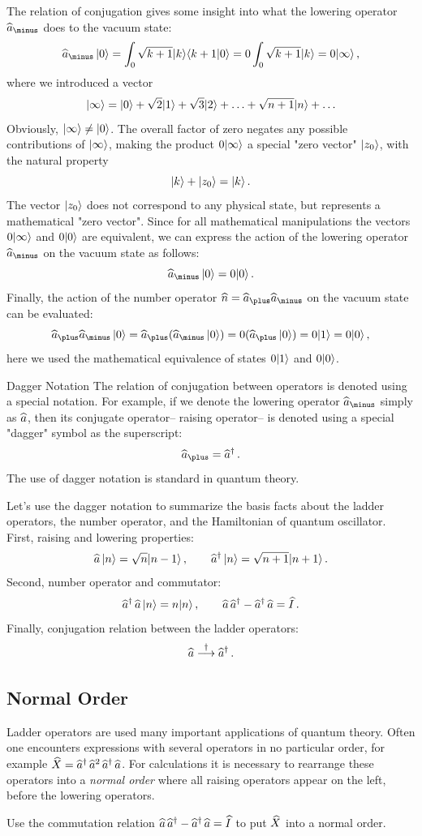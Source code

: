 The relation of conjugation gives some insight into what the lowering operator $\op{a}_\minus$ does to the vacuum state:
\[
\op{a}_\minus\,\ket{0}=\int_0  \sqrt{k+1}\ket{k}\braket{k+1}{0}=0\int_0\sqrt{k+1}\ket{k}=0\ket{\infty}\,,
\]
where we introduced a vector 
\[
|{\infty}\rangle=|{0}\rangle+\sqrt{2}|{1}\rangle+\sqrt{3}|{2}\rangle+\ldots+\sqrt{n+1}|{n}\rangle+\ldots
\]
Obviously, $|{\infty}\rangle\ne|{0}\rangle$. The overall factor of zero negates any possible contributions of $|{\infty}\rangle$, making the product $0|{\infty}\rangle$ a special "zero vector" $|{z_0}\rangle$, with the natural property
\[
|{k}\rangle+|{z_0}\rangle=|{k}\rangle\,.
\]
The vector $|{z_0}\rangle$ does not correspond to any physical state, but represents a mathematical "zero vector". Since for all mathematical manipulations the vectors $0|{\infty}\rangle$ and $0|{0}\rangle$ are equivalent,
we can express the action of the lowering operator $\op{a}_\minus$ on the vacuum state as follows:
\[
\op{a}_\minus\,\ket{0}=0\ket{0}\,.
\]
Finally, the action of the number operator $\op{n}=\op{a}_\plus\op{a}_\minus$ on the vacuum state can be evaluated:
\[
\op{a}_\plus\op{a}_\minus\,\ket{0}=\op{a}_\plus(\op{a}_\minus\,\ket{0})=0(\op{a}_\plus\,\ket{0})=0\ket{1}=0\ket{0}\,,
\]
here we used the mathematical equivalence of states $0|{1}\rangle$ and $0|{0}\rangle$.

\begin{mybio}{Dagger Notation}
	The relation of conjugation between operators is denoted using a special notation. For example, if we denote the lowering operator $\op{a}_\minus$ simply as $\widehat{a}$, then its conjugate operator-- raising operator-- is denoted using a special "dagger" symbol as the superscript:
	\[
	\op{a}_\plus = \op{a}^\dagger\,.
	\]
	The use of dagger notation is standard in quantum theory. 
	
	Let's use the dagger notation to summarize the basis facts about the ladder operators, the number operator, and the Hamiltonian of quantum oscillator.
	First, raising and lowering properties:
	\[
	\widehat{a}\,|{n}\rangle=\sqrt{n}|{n-1}\rangle\,,\qquad\widehat{a}^\dagger\,|{n}\rangle=\sqrt{n+1}|{n+1}\rangle\,.
	\]
	Second, number operator and commutator:
	\[
	\widehat{a}^\dagger\,\widehat{a}\,|{n}\rangle=n|{n}\rangle\,,\qquad \widehat{a}\,\widehat{a}^\dagger-\widehat{a}^\dagger\,\widehat{a}=\widehat{I}\,.
	\]
	Finally, conjugation relation between the ladder operators:
	\[
	\widehat{a}\overset{\dagger}{\longrightarrow}\widehat{a}^\dagger\,.
	\]
\end{mybio}
\subsection*{Normal Order}
\begin{exercise}
	Ladder operators are used many important applications of quantum theory. Often one encounters expressions with several operators in no particular order, for example $\widehat{X}=\widehat{a}^\dagger\,\widehat{a}^2\,\widehat{a}^\dagger\,\widehat{a}$. For calculations it is necessary to rearrange these operators into a \emph{normal order} where all raising operators appear on the left, before the lowering operators.
	
	Use the commutation relation $\widehat{a}\,\widehat{a}^\dagger-\widehat{a}^\dagger\,\widehat{a}=\widehat{I}$ to put $\widehat{X}$ into a normal order.
\end{exercise}


